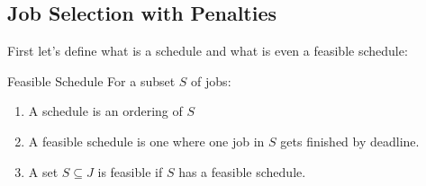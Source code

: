 \subsection{Job Selection with Penalties}

\begin{algoprob}
\end{algoprob}

First let's define what is a schedule and what is even a feasible schedule:

\begin{Definition}{Feasible Schedule}{}
	For a subset $S$ of jobs:
	\begin{enumerate}[label=\bfseries\tiny\protect\circled{\small\arabic*}]
	\item A schedule is an ordering of $S$
	\item A feasible schedule is one where one job in $S$ gets finished by deadline.
	\item A set $S\subseteq J$ is feasible if $S$ has a feasible schedule.
	\end{enumerate}
\end{Definition}\parinn

